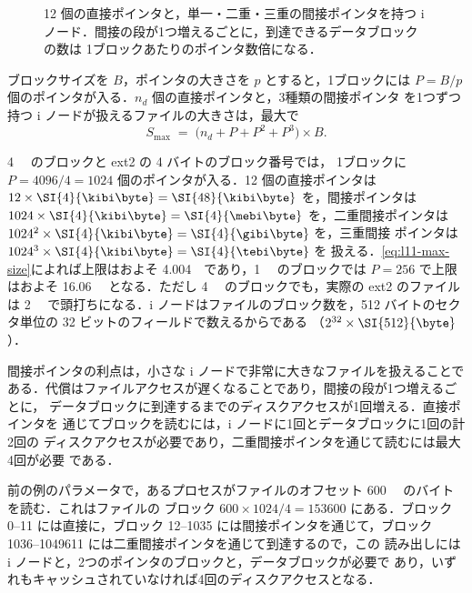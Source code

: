 \documentclass[../main.tex]{subfiles}
\begin{document}
\begin{figure}[htbp]
  \centering
  
  \caption{12 個の直接ポインタと，単一・二重・三重の間接ポインタを持つ
    i ノード．間接の段が1つ増えるごとに，到達できるデータブロックの数は
    1ブロックあたりのポインタ数倍になる．}
  \label{fig:l11-inode}
\end{figure}

ブロックサイズを $B$，ポインタの大きさを $p$ とすると，1ブロックには
$P = B/p$ 個のポインタが入る．$n_d$ 個の直接ポインタと，3種類の間接ポインタ
を1つずつ持つ i ノードが扱えるファイルの大きさは，最大で
\begin{equation}
  S_{\max} \;=\; \bigl(n_d + P + P^2 + P^3\bigr) \times B .
  \label{eq:l11-max-size}
\end{equation}

\begin{example}
  \SI{4}{\kibi\byte} のブロックと ext2 の 4 バイトのブロック番号では，
  1ブロックに $P = 4096/4 = 1024$ 個のポインタが入る．12 個の直接ポインタは
  $12 \times \SI{4}{\kibi\byte} = \SI{48}{\kibi\byte}$ を，間接ポインタは
  $1024 \times \SI{4}{\kibi\byte} = \SI{4}{\mebi\byte}$ を，二重間接ポインタは
  $1024^2 \times \SI{4}{\kibi\byte} = \SI{4}{\gibi\byte}$ を，三重間接
  ポインタは $1024^3 \times \SI{4}{\kibi\byte} = \SI{4}{\tebi\byte}$ を
  扱える．\cref{eq:l11-max-size}によれば上限はおよそ
  \SI{4.004}{\tebi\byte}であり，\SI{1}{\kibi\byte} のブロックでは $P = 256$
  で上限はおよそ \SI{16.06}{\gibi\byte} となる．ただし
  \SI{4}{\kibi\byte} のブロックでも，実際の ext2 のファイルは
  \SI{2}{\tebi\byte} で頭打ちになる．i ノードはファイルのブロック数を，512
  バイトのセクタ単位の 32 ビットのフィールドで数えるからである
  （$2^{32} \times \SI{512}{\byte}$）．
\end{example}

間接ポインタの利点は，小さな i ノードで非常に大きなファイルを扱えることで
ある．代償はファイルアクセスが遅くなることであり，間接の段が1つ増えるごとに，
データブロックに到達するまでのディスクアクセスが1回増える．直接ポインタを
通じてブロックを読むには，i ノードに1回とデータブロックに1回の計2回の
ディスクアクセスが必要であり，二重間接ポインタを通じて読むには最大4回が必要
である．

\begin{example}
  前の例のパラメータで，あるプロセスがファイルのオフセット
  \SI{600}{\mebi\byte} のバイトを読む．これはファイルの
  ブロック $600 \times 1024 / 4 = \num{153600}$ にある．ブロック 0--11
  には直接に，ブロック 12--\num{1035} には間接ポインタを通じて，ブロック
  \num{1036}--\num{1049611} には二重間接ポインタを通じて到達するので，この
  読み出しには i ノードと，2つのポインタのブロックと，データブロックが必要で
  あり，いずれもキャッシュされていなければ4回のディスクアクセスとなる．
\end{example}
\end{document}
